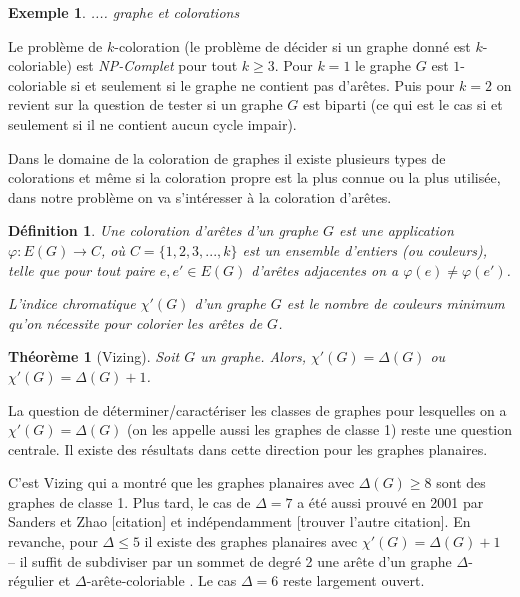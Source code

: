 \documentclass[10pt,a4paper]{article}
\newtheorem{definition}{Définition}
\newtheorem{theorem}{Théorème}
\newtheorem{exemple}{Exemple}
\begin{document}
\begin{exemple}
.... graphe et colorations
\end{exemple}


Le problème de $k$-coloration (le problème de décider si un graphe donné est $k$-coloriable) est \emph{NP-Complet} pour tout $k \geq 3$. Pour $k = 1$ le graphe $G$ est $1$-coloriable si et seulement si le graphe ne contient pas d'arêtes. Puis pour $k =  2$ on revient sur la question de tester si un graphe $G$ est biparti (ce qui est le cas si et seulement si il ne contient aucun cycle impair). 

Dans le domaine de la coloration de graphes il existe plusieurs types de colorations et même si la coloration propre est la plus connue ou la plus utilisée, dans notre problème on va s'intéresser à la coloration d'arêtes.

\begin{definition}%
Une \emph{coloration d'arêtes} d'un graphe $G$ est une application $\varphi: E(G) \to C$, où $C=\{1,2,3,...,k\}$ est un ensemble d'entiers (ou \emph{couleurs}), telle que pour tout paire $e, e' \in E(G)$ d'arêtes adjacentes on a $\varphi(e) \neq \varphi(e')$.

L'\emph{indice chromatique} $\chi'(G)$ d'un graphe $G$ est le nombre de couleurs minimum qu'on nécessite pour colorier les arêtes de $G$.
\end{definition}

\begin{theorem}[Vizing]
Soit $G$ un graphe. Alors, $\chi'(G) = \Delta(G)$ ou $\chi'(G) = \Delta(G) + 1$.
\end{theorem}

La question de déterminer/caractériser les classes de graphes pour lesquelles on a $\chi'(G) = \Delta(G)$ (on les appelle aussi les graphes de classe 1) reste une question centrale. Il existe des résultats dans cette direction pour les graphes planaires.

C'est Vizing \cite{Vizing} qui a montré que les graphes planaires avec $\Delta(G)\ge 8$ sont des graphes de classe 1. Plus tard, le cas de $\Delta = 7$ a été aussi prouvé en 2001 par Sanders et Zhao [citation] et indépendamment [trouver l'autre citation]. 
En revanche, pour $\Delta\le 5$ il existe des graphes planaires avec $\chi'(G)=\Delta(G)+1$ -- il suffit de subdiviser par un sommet de degré 2 une arête d'un graphe $\Delta$-régulier et $\Delta$-arête-coloriable \cite{Vizing2}.
Le cas $\Delta = 6$ reste largement ouvert. 
\end{document}
